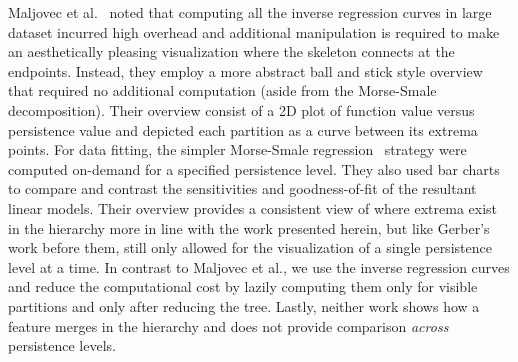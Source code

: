 Maljovec et al.~\cite{maljovec16} noted that computing all the inverse regression curves in large dataset incurred high overhead and additional manipulation is required to make an aesthetically pleasing visualization where the skeleton connects at the endpoints.
Instead, they employ a more abstract ball and stick style overview that required no additional computation (aside from the Morse-Smale decomposition). Their overview consist of a 2D plot of function value versus persistence value and depicted each partition as a curve between its extrema points. For data fitting, the simpler Morse-Smale regression~\cite{Gerber2011,Gerber2012} strategy were computed on-demand for a specified persistence level. They also used bar charts to compare and contrast the sensitivities and goodness-of-fit of the resultant linear models. Their overview provides a consistent view of where extrema exist in the hierarchy more in line with the work presented herein, but like Gerber's work before them, still only allowed for the visualization of a single persistence level at a time. In contrast to Maljovec et al., we use the inverse regression curves and reduce the computational cost by lazily computing them only for visible partitions and only after reducing the tree.
%
Lastly, neither work shows how a feature merges in the hierarchy and does not provide comparison \textit{across} persistence levels.

        
        
        
